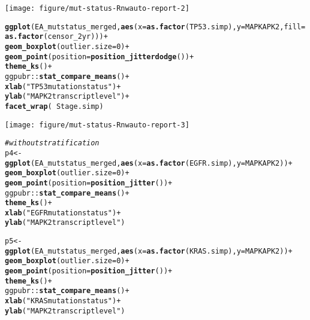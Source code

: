 \documentclass{article}\usepackage[]{graphicx}\usepackage[]{color}
\makeatletter
\newcommand{\hlnum}[1]{\textcolor[rgb]{0.686,0.059,0.569}{#1}}%
\newcommand{\hlstr}[1]{\textcolor[rgb]{0.192,0.494,0.8}{#1}}%
\newcommand{\hlcom}[1]{\textcolor[rgb]{0.678,0.584,0.686}{\textit{#1}}}%
\newcommand{\hlopt}[1]{\textcolor[rgb]{0,0,0}{#1}}%
\newcommand{\hlstd}[1]{\textcolor[rgb]{0.345,0.345,0.345}{#1}}%
\newcommand{\hlkwb}[1]{\textcolor[rgb]{0.69,0.353,0.396}{#1}}%
\newcommand{\hlkwc}[1]{\textcolor[rgb]{0.333,0.667,0.333}{#1}}%
\newcommand{\hlkwd}[1]{\textcolor[rgb]{0.737,0.353,0.396}{\textbf{#1}}}%
\newenvironment{kframe}{%
 \def\at@end@of@kframe{}%
 \ifinner\ifhmode%
  \def\at@end@of@kframe{\end{minipage}}%
  \begin{minipage}{\columnwidth}%
 \fi\fi%
 \def\FrameCommand##1{\hskip\@totalleftmargin \hskip-\fboxsep
 \colorbox{shadecolor}{##1}\hskip-\fboxsep
     \hskip-\linewidth \hskip-\@totalleftmargin \hskip\columnwidth}%
 \MakeFramed {\advance\hsize-\width
   \@totalleftmargin\z@ \linewidth\hsize
   \@setminipage}}%
 {\par\unskip\endMakeFramed%
 \at@end@of@kframe}
\newenvironment{knitrout}{}{} %
\makeatother
\begin{document}
\begin{knitrout}
\begin{kframe}
{\ttfamily\noindent\color{warningcolor}{\#\# Warning: Computation failed in `stat\_compare\_means()`:\\\#\# Problem with `mutate()` input `p`.\\\#\# x all observations are in the same group\\\#\# i Input `p` is `purrr::map(...)`.}}\end{kframe}

{\centering \texttt{[image: figure/mut-status-Rnwauto-report-2]} 

}


\begin{kframe}\begin{alltt}
\hlkwd{ggplot}\hlstd{(EA_mutstatus_merged,} \hlkwd{aes}\hlstd{(}\hlkwc{x}\hlstd{=}\hlkwd{as.factor}\hlstd{(TP53.simp),} \hlkwc{y}\hlstd{=MAPKAPK2,} \hlkwc{fill}\hlstd{=}\hlkwd{as.factor}\hlstd{(censor_2yr)))}\hlopt{+}
  \hlkwd{geom_boxplot}\hlstd{(}\hlkwc{outlier.size}\hlstd{=}\hlnum{0}\hlstd{)}\hlopt{+}
  \hlkwd{geom_point}\hlstd{(}\hlkwc{position} \hlstd{=}\hlkwd{position_jitterdodge}\hlstd{())}\hlopt{+}
  \hlkwd{theme_ks}\hlstd{()}\hlopt{+}
  \hlstd{ggpubr}\hlopt{::}\hlkwd{stat_compare_means}\hlstd{()}\hlopt{+}
   \hlkwd{xlab}\hlstd{(}\hlstr{"TP53 mutation status"}\hlstd{)}\hlopt{+}
  \hlkwd{ylab}\hlstd{(}\hlstr{"MAPK2 transcript level"}\hlstd{)}\hlopt{+}
  \hlkwd{facet_wrap}\hlstd{(}\hlopt{~}\hlstd{Stage.simp)}
\end{alltt}
\end{kframe}

{\centering \texttt{[image: figure/mut-status-Rnwauto-report-3]} 

}


\begin{kframe}\begin{alltt}
\hlcom{# without stratification }
\hlstd{p4} \hlkwb{<-} \hlkwd{ggplot}\hlstd{(EA_mutstatus_merged,} \hlkwd{aes}\hlstd{(}\hlkwc{x}\hlstd{=}\hlkwd{as.factor}\hlstd{(EGFR.simp),} \hlkwc{y}\hlstd{=MAPKAPK2))}\hlopt{+}
  \hlkwd{geom_boxplot}\hlstd{(}\hlkwc{outlier.size}\hlstd{=}\hlnum{0}\hlstd{)}\hlopt{+}
  \hlkwd{geom_point}\hlstd{(}\hlkwc{position} \hlstd{=}\hlkwd{position_jitter}\hlstd{())}\hlopt{+}
  \hlstd{ggpubr}\hlopt{::}\hlkwd{stat_compare_means}\hlstd{()}\hlopt{+}
  \hlkwd{theme_ks}\hlstd{()}\hlopt{+}
  \hlkwd{xlab}\hlstd{(}\hlstr{"EGFR mutation status"}\hlstd{)}\hlopt{+}
  \hlkwd{ylab}\hlstd{(}\hlstr{"MAPK2 transcript level"}\hlstd{)}

\hlstd{p5} \hlkwb{<-} \hlkwd{ggplot}\hlstd{(EA_mutstatus_merged,} \hlkwd{aes}\hlstd{(}\hlkwc{x}\hlstd{=}\hlkwd{as.factor}\hlstd{(KRAS.simp),} \hlkwc{y}\hlstd{=MAPKAPK2))}\hlopt{+}
  \hlkwd{geom_boxplot}\hlstd{(}\hlkwc{outlier.size}\hlstd{=}\hlnum{0}\hlstd{)}\hlopt{+}
  \hlkwd{geom_point}\hlstd{(}\hlkwc{position} \hlstd{=}\hlkwd{position_jitter}\hlstd{())}\hlopt{+}
  \hlkwd{theme_ks}\hlstd{()}\hlopt{+}
  \hlstd{ggpubr}\hlopt{::}\hlkwd{stat_compare_means}\hlstd{()}\hlopt{+}
   \hlkwd{xlab}\hlstd{(}\hlstr{"KRAS mutation status"}\hlstd{)}\hlopt{+}
  \hlkwd{ylab}\hlstd{(}\hlstr{"MAPK2 transcript level"}\hlstd{)}


\end{alltt}
\end{kframe}
\end{knitrout}
\end{document}
